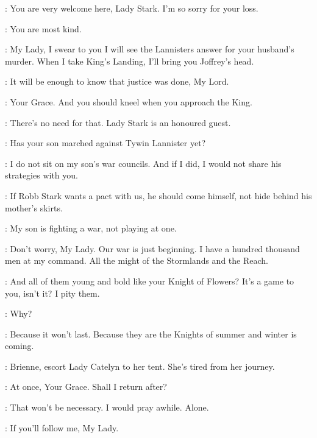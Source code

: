 \MARGAERY: You are very welcome here, Lady Stark. I'm so sorry for your loss. 

\CATELYN: You are most kind. 

\RENLY: My Lady, I swear to you I will see the Lannisters answer for your husband's murder. When I take King's Landing, I'll bring you Joffrey's head. 


\CATELYN: It will be enough to know that justice was done, My Lord. 

\BRIENNE: Your Grace. And you should kneel when you approach the King. 

\RENLY: There's no need for that. Lady Stark is an honoured guest. 

\LORAS: Has your son marched against Tywin Lannister yet? 

\CATELYN: I do not sit on my son's war councils. And if I did, I would not share his strategies with you. 

\LORAS: If Robb Stark wants a pact with us, he should come himself, not hide behind his mother's skirts. 

\CATELYN: My son is fighting a war, not playing at one. 



\RENLY: Don't worry, My Lady. Our war is just beginning. I have a hundred thousand men at my command. All the might of the Stormlands and the Reach. 

\CATELYN: And all of them young and bold like your Knight of Flowers? It's a game to you, isn't it? I pity them. 

\RENLY: Why? 

\CATELYN: Because it won't last. Because they are the Knights of summer and winter is coming. 

\RENLY: Brienne, escort Lady Catelyn to her tent. She's tired from her journey. 

\BRIENNE: At once, Your Grace. Shall I return after? 

\RENLY: That won't be necessary. I would pray awhile. Alone. 

\BRIENNE: If you'll follow me, My Lady. 


